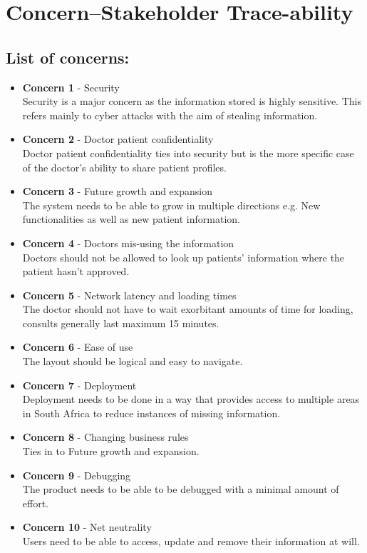 \documentclass[10pt,oneside]{report}
\begin{document}
\section{Concern--Stakeholder Trace-ability}

\subsection{List of concerns:}

\begin{itemize}
\item \textbf{Concern 1} - Security\\
	Security is a major concern as the information stored is highly sensitive. This refers mainly to cyber attacks with the aim of stealing information.
\item \textbf{Concern 2} - Doctor patient confidentiality\\
	Doctor patient confidentiality ties into security but is the more specific case of the doctor's ability to share patient profiles.
\item \textbf{Concern 3} - Future growth and expansion\\
	The system needs to be able to grow in multiple directions e.g. New functionalities as well as new patient information.
\item \textbf{Concern 4} - Doctors mis-using the information\\
	Doctors should not be allowed to look up patients' information where the patient hasn't approved.
\item \textbf{Concern 5} - Network latency and loading times\\
	The doctor should not have to wait exorbitant amounts of time for loading, consults generally last maximum 15 minutes.
\item \textbf{Concern 6} - Ease of use\\
	The layout should be logical and easy to navigate.
\item \textbf{Concern 7} - Deployment\\
	Deployment needs to be done in a way that provides access to multiple areas in South Africa to reduce instances of missing information.
\item \textbf{Concern 8} - Changing business rules\\
	Ties in to Future growth and expansion.
\item \textbf{Concern 9} - Debugging\\
	The product needs to be able to be debugged with a minimal amount of effort.
\item \textbf{Concern 10} - Net neutrality\\
	Users need to be able to access, update and remove their information at will.
\end{itemize}
\end{document}
